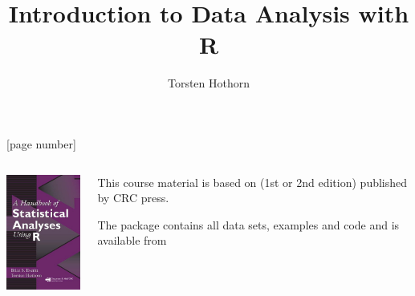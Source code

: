 \documentclass{beamer}
\title{Introduction to Data Analysis with \textsf{R}}
\author[T. Hothorn]{Torsten Hothorn}
\institute{
  Universit\"at Z\"urich \\
  \texttt{Torsten.Hothorn@R-project.org}
}
\date{}
\begin{document}
\frame{\titlepage}

[page number]

\begin{frame}[fragile]

    \begin{columns}

       \begin{column}{3.5cm}
           \includegraphics[width = 3cm]{graphics/HSAUR}
       \end{column}

       \begin{column}{7.5cm}

           This course material is based on 
           (1st or 2nd edition) published by CRC press. 

           The \R{} package  contains all data sets, 
           examples and \R{} code and is available from 
       \end{column}
    \end{columns}

\end{frame}
\end{document}
